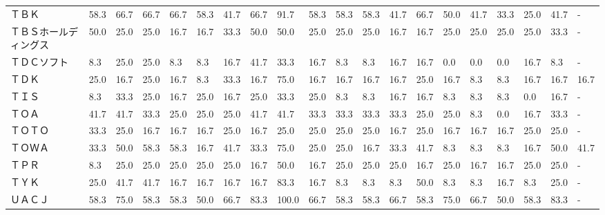 \begin{tabular}{llllllllllllllllllll}
ＴＢＫ             &   58.3 &   66.7 &      66.7 &      66.7 &       58.3 &   41.7 &   66.7 &   91.7 &    58.3 &    58.3 &   58.3 &  41.7 &   66.7 &    50.0 &    41.7 &  33.3 &  25.0 &  41.7 &     - \\
ＴＢＳホールディングス     &   50.0 &   25.0 &      25.0 &      16.7 &       16.7 &   33.3 &   50.0 &   50.0 &    25.0 &    25.0 &   25.0 &  16.7 &   16.7 &    25.0 &    25.0 &  25.0 &  25.0 &  33.3 &     - \\
ＴＤＣソフト          &    8.3 &   25.0 &      25.0 &       8.3 &        8.3 &   16.7 &   41.7 &   33.3 &    16.7 &     8.3 &    8.3 &  16.7 &   16.7 &     0.0 &     0.0 &   0.0 &  16.7 &   8.3 &     - \\
ＴＤＫ             &   25.0 &   16.7 &      25.0 &      16.7 &        8.3 &   33.3 &   16.7 &   75.0 &    16.7 &    16.7 &   16.7 &  16.7 &   25.0 &    16.7 &     8.3 &   8.3 &  16.7 &  16.7 &  16.7 \\
ＴＩＳ             &    8.3 &   33.3 &      25.0 &      16.7 &       25.0 &   16.7 &   25.0 &   33.3 &    25.0 &     8.3 &    8.3 &  16.7 &   16.7 &     8.3 &     8.3 &   8.3 &   0.0 &  16.7 &     - \\
ＴＯＡ             &   41.7 &   41.7 &      33.3 &      25.0 &       25.0 &   25.0 &   41.7 &   41.7 &    33.3 &    33.3 &   33.3 &  33.3 &   25.0 &    25.0 &     8.3 &   0.0 &  16.7 &  33.3 &     - \\
ＴＯＴＯ            &   33.3 &   25.0 &      16.7 &      16.7 &       16.7 &   25.0 &   16.7 &   25.0 &    25.0 &    25.0 &   25.0 &  16.7 &   25.0 &    16.7 &    16.7 &  16.7 &  25.0 &  25.0 &     - \\
ＴＯＷＡ            &   33.3 &   50.0 &      58.3 &      58.3 &       16.7 &   41.7 &   33.3 &   75.0 &    25.0 &    25.0 &   16.7 &  33.3 &   41.7 &     8.3 &     8.3 &   8.3 &  16.7 &  50.0 &  41.7 \\
ＴＰＲ             &    8.3 &   25.0 &      25.0 &      25.0 &       25.0 &   25.0 &   16.7 &   50.0 &    16.7 &    25.0 &   25.0 &  25.0 &   16.7 &    25.0 &    16.7 &  16.7 &  25.0 &  25.0 &     - \\
ＴＹＫ             &   25.0 &   41.7 &      41.7 &      16.7 &       16.7 &   16.7 &   16.7 &   83.3 &    16.7 &     8.3 &    8.3 &   8.3 &   50.0 &     8.3 &     8.3 &  16.7 &   8.3 &  25.0 &     - \\
ＵＡＣＪ            &   58.3 &   75.0 &      58.3 &      58.3 &       50.0 &   66.7 &   83.3 &  100.0 &    66.7 &    58.3 &   58.3 &  66.7 &   58.3 &    75.0 &    66.7 &  50.0 &  58.3 &  83.3 &     - \\

\end{tabular}

